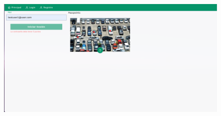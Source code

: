 \begin{anexos}
\begin{figure}[H]
	\centering
	\begin{minipage}[b]{0.68\linewidth}  %
		\centering
		\includegraphics[width=\linewidth]{Graphics/capturas/cars-login-error-landscape.png}
		

\end{minipage}
\end{figure}
\end{anexos}
